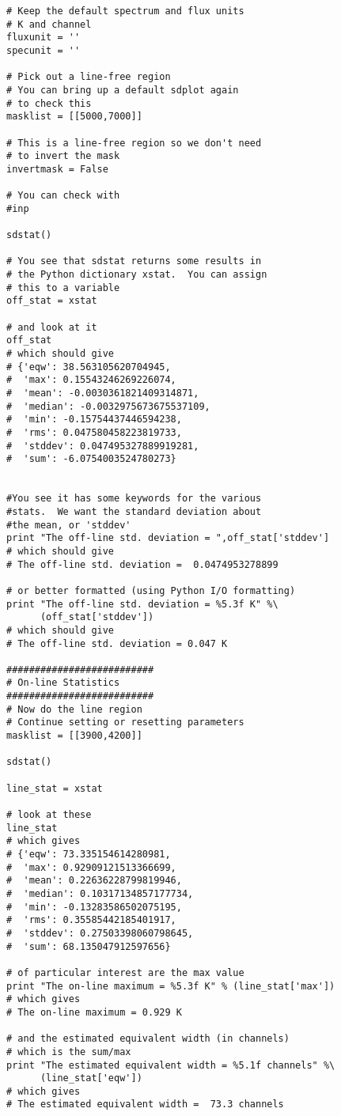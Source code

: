 \begin{verbatim}
# Keep the default spectrum and flux units
# K and channel
fluxunit = ''
specunit = ''

# Pick out a line-free region
# You can bring up a default sdplot again
# to check this
masklist = [[5000,7000]]

# This is a line-free region so we don't need
# to invert the mask
invertmask = False

# You can check with
#inp

sdstat()

# You see that sdstat returns some results in
# the Python dictionary xstat.  You can assign
# this to a variable
off_stat = xstat

# and look at it
off_stat
# which should give
# {'eqw': 38.563105620704945,
#  'max': 0.15543246269226074,
#  'mean': -0.0030361821409314871,
#  'median': -0.0032975673675537109,
#  'min': -0.15754437446594238,
#  'rms': 0.047580458223819733,
#  'stddev': 0.047495327889919281,
#  'sum': -6.0754003524780273}


#You see it has some keywords for the various
#stats.  We want the standard deviation about
#the mean, or 'stddev'
print "The off-line std. deviation = ",off_stat['stddev']
# which should give
# The off-line std. deviation =  0.0474953278899

# or better formatted (using Python I/O formatting)
print "The off-line std. deviation = %5.3f K" %\
      (off_stat['stddev'])
# which should give
# The off-line std. deviation = 0.047 K

##########################
# On-line Statistics
##########################
# Now do the line region
# Continue setting or resetting parameters
masklist = [[3900,4200]]

sdstat()

line_stat = xstat

# look at these
line_stat
# which gives
# {'eqw': 73.335154614280981,
#  'max': 0.92909121513366699,
#  'mean': 0.22636228799819946,
#  'median': 0.10317134857177734,
#  'min': -0.13283586502075195,
#  'rms': 0.35585442185401917,
#  'stddev': 0.27503398060798645,
#  'sum': 68.135047912597656}

# of particular interest are the max value
print "The on-line maximum = %5.3f K" % (line_stat['max'])
# which gives
# The on-line maximum = 0.929 K

# and the estimated equivalent width (in channels)
# which is the sum/max
print "The estimated equivalent width = %5.1f channels" %\
      (line_stat['eqw'])
# which gives
# The estimated equivalent width =  73.3 channels


\end{verbatim}
